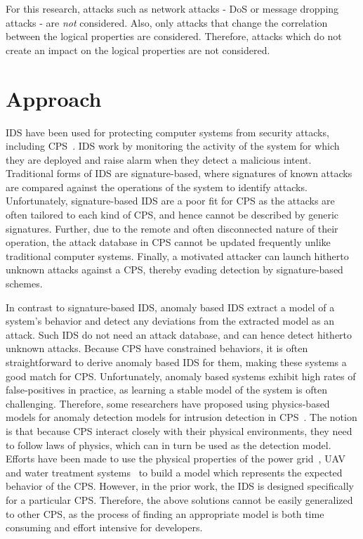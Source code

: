 For this research, attacks such as network attacks - \ac{DoS} or message dropping attacks - are \textit{not} considered. Also, only attacks that change the correlation between the logical properties are considered. Therefore, attacks which do not create an impact on the logical properties are not considered. 

\section{Approach}
\label{sec:Approach}

\ac{IDS} have been used for protecting computer systems from security attacks, including CPS~\cite{lu2015towards, mitchell2015behavior, bernieri2016testbed}. \ac{IDS} work by monitoring the activity of the system for which they are deployed and raise alarm when they detect a malicious intent. Traditional forms of \ac{IDS} are signature-based, where signatures of known attacks are compared against the operations of the system to identify attacks. Unfortunately, signature-based \ac{IDS} are a poor fit for \ac{CPS} as the attacks are often tailored to each kind of \ac{CPS}, and hence cannot be described by generic signatures. Further, due to the remote and often disconnected nature of their operation, the attack database in \ac{CPS} cannot be updated frequently unlike traditional computer systems. Finally, a motivated attacker can launch hitherto unknown attacks against a \ac{CPS}, thereby evading detection by signature-based schemes. 

In contrast to signature-based \ac{IDS}, anomaly based \ac{IDS} extract a model of a system's behavior and detect any deviations from the extracted model as an attack. Such \ac{IDS} do not need an attack database, and can hence detect hitherto unknown attacks. Because \ac{CPS} have constrained behaviors, it is often straightforward to derive anomaly based \ac{IDS} for them, making these systems a good match for \ac{CPS}. Unfortunately, anomaly based systems exhibit high rates of false-positives in practice, as learning a stable model of the system is often challenging. Therefore, some researchers have proposed using physics-based models for anomaly detection models for intrusion detection in \ac{CPS}~\cite{ mitchell2012specification,mitchell2014adaptive,choudhari2013stability,chen2018learning,zohrevand2016hidden}. The notion is that because \ac{CPS} interact closely with their physical environments, they need to follow laws of physics, which can in turn be used as the detection model. 
Efforts have been made to use the physical properties of the power grid~\cite{choudhari2013stability,paul2014unified}, \ac{UAV}~\cite{mitchell2012specification} and water treatment systems~\cite{adepu2016using} to build a model which represents the expected behavior of the \ac{CPS}. However, in the prior work, the \ac{IDS} is designed specifically for a particular \ac{CPS}. Therefore, the above solutions cannot be easily generalized to other \ac{CPS}, as the process of finding an appropriate model is both time consuming and effort intensive for developers. 

